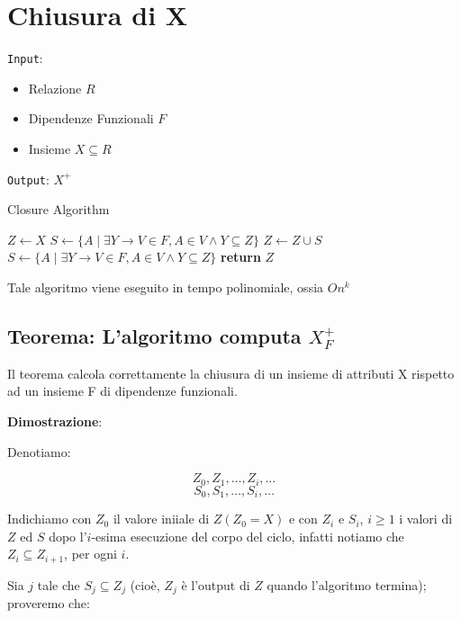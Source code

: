 \documentclass{article}
\begin{document}
    




\pagebreak
\section{Chiusura di X}
\texttt{Input}:
\begin{itemize}
  \item Relazione $R$
  \item Dipendenze Funzionali $F$
  \item Insieme $X \subseteq R$
\end{itemize}
\texttt{Output}: $X^{+}$\\

\begin{algorithm}
  \caption{Closure Algorithm}  
    \begin{algorithmic}[1]
  \State $Z \gets X$
  \State $S \gets \{A \mid \exists Y \rightarrow V \in F, A \in V \land Y \subseteq Z\}$
    \State $Z \gets Z \cup S$
    \State $S \gets \{A \mid \exists Y \rightarrow V \in F, A \in V \land Y \subseteq Z\}$
  \EndWhile
  \State \textbf{return} $Z$
  \end{algorithmic}
\end{algorithm}
Tale algoritmo viene eseguito in tempo polinomiale, ossia $On^{k}$

\subsection{Teorema: L'algoritmo computa $X_{F}^{+}$}
Il teorema calcola correttamente la chiusura di un insieme di attributi X rispetto ad un insieme F di dipendenze funzionali.

\textbf{Dimostrazione}:\par
Denotiamo:\par

\[Z_{0}, Z_{1}, \dots, Z_{i}, \dots \]
\[S_{0}, S_{1}, \dots, S_{i}, \dots\]

Indichiamo con $Z_{0}$ il valore iniiale di $Z (Z_{0} = X)$ e con $Z_{i}$ e $S_{i}$, $i \geq 1$ i valori di $Z$ ed $S$ dopo l'$i$-esima esecuzione del corpo del ciclo, infatti notiamo che $Z_{i} \subseteq Z_{i+1}$, per ogni $i$.\par
Sia $j$ tale che $S_{j} \subseteq Z_{j}$ (cioè,  $Z_{j}$ è l'output di $Z$ quando l'algoritmo termina); proveremo che:
\end{document}
